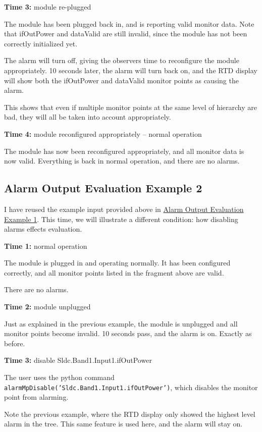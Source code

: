 \documentclass[letterpaper,12pt,oneside,pdftex]{article}
\newcommand{\mytime}[2]{\textbf{Time #1:} #2}
\begin{document}
\mytime{3}{module re-plugged}

The module has been plugged back in, and is reporting valid monitor data. Note
that ifOutPower and dataValid are still invalid, since the module has not been
correctly initialized yet.

The alarm will turn off, giving the observers time to reconfigure the module
appropriately. 10 seconds later, the alarm will turn back on, and the RTD
display will show both the ifOutPower and dataValid monitor points as causing
the alarm.

This shows that even if multiple monitor points at the same level of hierarchy
are bad, they will all be taken into account appropriately.

\mytime{4}{module reconfigured appropriately -- normal operation}

The module has now been reconfigured appropriately, and all monitor data is now
valid. Everything is back in normal operation, and there are no alarms.

\subsection{Alarm Output Evaluation Example 2}

I have reused the example input provided above in
\hyperref[alarmoutput-example1]{Alarm Output Evaluation Example 1}. This time,
we will illustrate a different condition: how disabling alarms effects
evaluation.

\mytime{1}{normal operation}

The module is plugged in and operating normally. It has been configured
correctly, and all monitor points listed in the fragment above are valid.

There are no alarms.

\mytime{2}{module unplugged}

Just as explained in the previous example, the module is unplugged and all
monitor points become invalid. 10 seconds pass, and the alarm is on. Exactly as
before.

\mytime{3}{disable Sldc.Band1.Input1.ifOutPower}

The user uses the python command
\texttt{alarmMpDisable('Sldc.Band1.Input1.ifOutPower')}, which disables the
monitor point from alarming.

Note the previous example, where the RTD display only showed the highest level
alarm in the tree. This same feature is used here, and the alarm will stay on.
\end{document}

